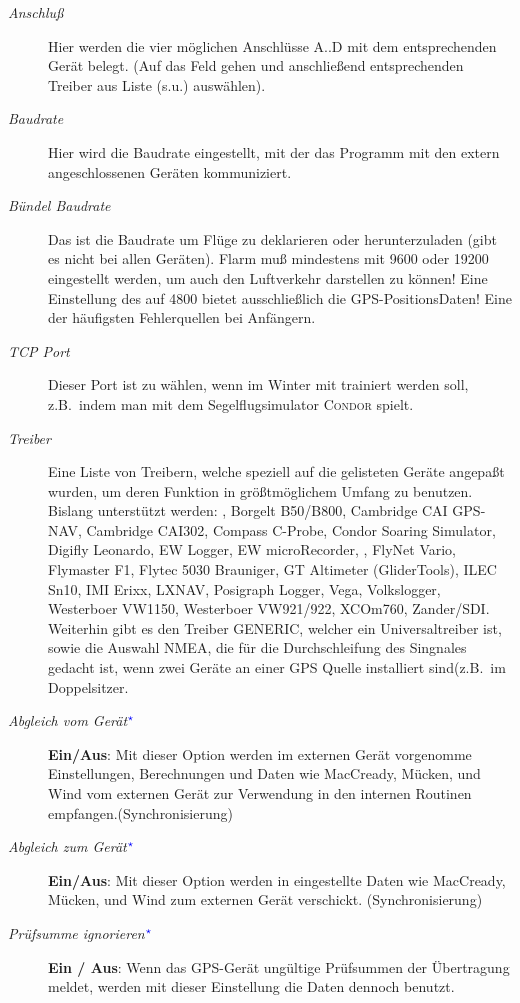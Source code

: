 \begin{description}
\item[\textit{Anschluß}]  Hier werden die vier möglichen Anschlüsse A..D mit dem entsprechenden Gerät belegt. (Auf das Feld gehen und anschließend entsprechenden Treiber aus Liste (s.u.) auswählen).
\item[\textit{Baudrate}]  Hier wird die Baudrate eingestellt, mit der das Programm mit den extern angeschlossenen Geräten kommuniziert.
\item[\textit{Bündel Baudrate}]  Das ist die Baudrate um Flüge zu deklarieren oder herunterzuladen (gibt es nicht bei allen Geräten).
\achtung Flarm muß  mindestens mit 9600 oder 19200 eingestellt werden, um auch den Luftverkehr darstellen zu können! Eine Einstellung des \fl auf 4800 bietet ausschließlich die GPS-PositionsDaten! Eine der häufigsten  Fehlerquellen bei Anfängern.
\item[\textit{TCP Port}]  Dieser Port ist zu wählen, wenn  im Winter mit \xc trainiert werden soll, z.B.\ indem man  mit dem
Segelflugsimulator \textsc{Condor} spielt.
\item[\textit{Treiber}] Eine Liste von Treibern, welche speziell auf die gelisteten Geräte angepaßt wurden, um deren Funktion in größtmöglichem Umfang zu benutzen.
Bislang unterstützt werden: \al, Borgelt B50/B800, Cambridge CAI GPS-NAV, Cambridge CAI302, Compass C-Probe, Condor Soaring Simulator, Digifly Leonardo,  EW Logger, EW microRecorder,
\fl, FlyNet Vario, Flymaster F1, Flytec 5030 Brauniger, GT Altimeter (GliderTools), ILEC Sn10, IMI Erixx, LXNAV, Posigraph Logger, Vega, Volkslogger, Westerboer VW1150, Westerboer VW921/922, XCOm760, Zander/SDI.
Weiterhin gibt es den Treiber GENERIC, welcher ein Universaltreiber ist, sowie die Auswahl NMEA, die für die Durchschleifung des Singnales gedacht ist, wenn zwei Geräte an einer GPS Quelle installiert sind(z.B.\ im Doppelsitzer.
\item[\textit{Abgleich vom Gerät$^{\textcolor{blue}{\star}}$}]  {\bf Ein/Aus}: Mit dieser Option werden im externen Gerät vorgenomme Einstellungen, Berechnungen und Daten wie MacCready, Mücken, und Wind vom externen Gerät zur Verwendung in den internen Routinen empfangen.(Synchronisierung)
\item[\textit{Abgleich zum Gerät$^{\textcolor{blue}{\star}}$}]  {\bf Ein/Aus}: Mit dieser Option werden in \xc eingestellte Daten wie MacCready, Mücken, und Wind zum externen Gerät verschickt. (Synchronisierung)
\item[\textit{Prüfsumme ignorieren$^{\textcolor{blue}{\star}}$}] {\bf Ein / Aus}: Wenn das GPS-Gerät ungültige Prüfsummen der Übertragung meldet, werden mit
dieser Einstellung  die Daten dennoch benutzt.
\end{description}



